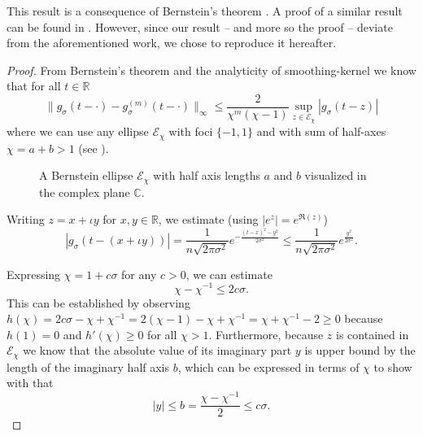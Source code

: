 This result is a consequence of Bernstein's theorem \cite[theorem~4.3]{trefethen2008gauss}.
A proof of a similar result can be found in \cite[theorem~2]{lin2017randomized}.
However, since our result -- and more so the proof -- deviate from the aforementioned
work, we chose to reproduce it hereafter.
\begin{proof}
    From Bernstein's theorem \cite[theorem~4.3]{trefethen2008gauss}
    and the analyticity of \gls{smoothing-kernel} we know that for all $t \in \mathbb{R}$
    \begin{equation}
        \lVert g_{\sigma}(t - \cdot) - g_{\sigma}^{(m)}(t - \cdot) \rVert _{\infty}
        \leq \frac{2}{\chi^{m}(\chi - 1)} \sup_{z \in \mathcal{E}_{\chi}} |g_{\sigma}(t - z)|
        \label{equ:2-chebyshev-convergence-proof-base}
    \end{equation}
    where we can use any ellipse $\mathcal{E}_{\chi}$
    with foci $\{-1, 1\}$ and with sum of half-axes $\chi = a + b > 1$
    (see ).

    \begin{figure}[ht]
        \centering
        
        \caption{A Bernstein ellipse $\mathcal{E}_{\chi}$ with half axis lengths $a$ and
            $b$ visualized in the complex plane $\mathbb{C}$.}
        \label{fig:2-chebyshev-proof-bernstein-ellipse}
    \end{figure}

    Writing $z = x + \iota y$ for $x,y \in \mathbb{R}$, we estimate (using $|e^z| = e^{\Re(z)}$)
    \begin{equation}
        |g_{\sigma}(t - (x + \iota y))| %
        = \frac{1}{n \sqrt{2 \pi \sigma^2}} e^{- \frac{(t - x)^2 - y^2}{2 \sigma^2}}
        \leq \frac{1}{n \sqrt{2 \pi \sigma^2}} e^{\frac{y^2}{2 \sigma^2}}.
    \end{equation}

    Expressing $\chi = 1 + c \sigma$ for any $c > 0$,
    we can estimate
    \begin{equation}
        \chi - \chi^{-1} \leq 2c\sigma.
        \label{equ:2-chebyshev-bernstein-proof-estimate}
    \end{equation}
    This can be established by observing
    $h(\chi) = 2c\sigma - \chi + \chi^{-1} = 2(\chi - 1) - \chi + \chi^{-1} = \chi + \chi^{-1} - 2 \geq 0$
    because $h(1) = 0$ and $h'(\chi) \geq 0$ for all $\chi > 1$.
    Furthermore, because $z$ is
    contained in $\mathcal{E}_{\chi}$ we know that the absolute value of its
    imaginary part $y$ is upper bound by the length of the imaginary half axis $b$,
    which can be expressed in terms of $\chi$ to show with 
    that
    \begin{equation}
        |y| \leq b = \frac{\chi - \chi^{-1}}{2} \leq c\sigma.
    \end{equation}


\end{proof}
